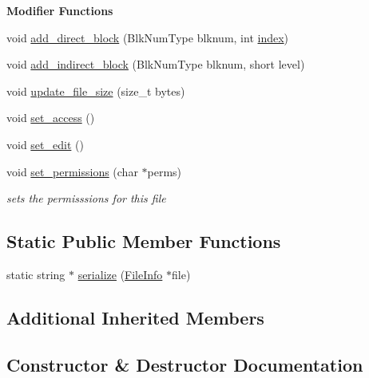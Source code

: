 \begin{Indent}\textbf{ Modifier Functions}\par
\begin{DoxyCompactItemize}
\item 
void \mbox{\hyperlink{classFileInfo_a1537d2ac2b5c170d144911c8337c81bc}{add\+\_\+direct\+\_\+block}} (Blk\+Num\+Type blknum, int \mbox{\hyperlink{structindex}{index}})
\item 
void \mbox{\hyperlink{classFileInfo_a074956f43b5a6900205a541dbeaeb8c5}{add\+\_\+indirect\+\_\+block}} (Blk\+Num\+Type blknum, short level)
\item 
void \mbox{\hyperlink{classFileInfo_a3c548a8dfcb6530bfef7551ac24ca473}{update\+\_\+file\+\_\+size}} (size\+\_\+t bytes)
\item 
void \mbox{\hyperlink{classFileInfo_aacaeadeeb41726f8cbea0b7cb1ff6a22}{set\+\_\+access}} ()
\item 
void \mbox{\hyperlink{classFileInfo_a05eb10c6804660ecd47e556c27ecd019}{set\+\_\+edit}} ()
\item 
void \mbox{\hyperlink{classFileInfo_a377208012195dba0b24723837f6db39f}{set\+\_\+permissions}} (char $\ast$perms)
\begin{DoxyCompactList}\small\item\em sets the permisssions for this file \end{DoxyCompactList}\end{DoxyCompactItemize}
\end{Indent}
\subsection*{Static Public Member Functions}
\begin{DoxyCompactItemize}
\item 
static string $\ast$ \mbox{\hyperlink{classFileInfo_a64fc62c3e376dfd61088932d8b793589}{serialize}} (\mbox{\hyperlink{classFileInfo}{File\+Info}} $\ast$file)
\end{DoxyCompactItemize}
\subsection*{Additional Inherited Members}


\subsection{Constructor \& Destructor Documentation}
\mbox{\label{classFileInfo_a3586bb4f50c4a0f63ff4ea0a1e56ce9c}} 
